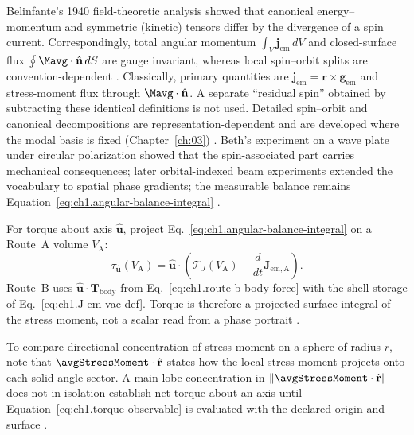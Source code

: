 Belinfante's 1940 field-theoretic analysis \cite{belinfante1940} showed that canonical
energy--momentum and symmetric (kinetic) tensors differ by the divergence of a spin
current. Correspondingly, total angular momentum
$\int_V \mathbf{j}_{\mathrm{em}}\,dV$ and closed-surface flux
$\oint \Mavg\cdot\hat{\mathbf{n}}\,dS$ are gauge invariant, whereas local spin--orbit splits are convention-dependent \cite{belinfante1940}. Classically, primary quantities are $\mathbf{j}_{\mathrm{em}}=\mathbf{r}\times\mathbf{g}_{\mathrm{em}}$ and stress-moment flux through $\Mavg\cdot\hat{\mathbf{n}}$. A separate
``residual spin'' obtained by subtracting these identical definitions is not used.
Detailed spin--orbit and canonical decompositions are representation-dependent and are
developed where the modal basis is fixed (Chapter~\ref{ch:03}) \cite{belinfante1940,tai1994}.
Beth's experiment on a wave plate under circular polarization
\cite{beth1936} showed that the spin-associated part carries mechanical consequences; later orbital-indexed beam experiments
\cite{allen1992} extended the vocabulary to spatial phase gradients; the measurable
balance remains Equation~\eqref{eq:ch1.angular-balance-integral} \cite{belinfante1940}.

For torque about axis $\hat{\mathbf{u}}$, project Eq.~\eqref{eq:ch1.angular-balance-integral} on a Route~A volume $V_{\mathrm{A}}$:
\begin{equation}
\label{eq:ch1.torque-observable}
\tau_{\hat{\mathbf{u}}}(V_{\mathrm{A}})
=\hat{\mathbf{u}}\cdot
\left(
\boldsymbol{\mathcal{T}}_J(V_{\mathrm{A}})-\frac{d}{dt}\mathbf{J}_{\mathrm{em,A}}
\right).
\end{equation}
Route~B uses $\hat{\mathbf{u}}\cdot\mathbf{T}_{\mathrm{body}}$ from Eq.~\eqref{eq:ch1.route-b-body-force} with the shell storage of Eq.~\eqref{eq:ch1.J-em-vac-def}.
Torque is therefore a projected surface integral of the stress moment, not a scalar read from a phase portrait \cite{beth1936,stratton1941}.

To compare directional concentration of stress moment on a sphere of radius $r$, note that $\avgStressMoment\cdot\hat{\mathbf{r}}$ states how the local stress moment projects onto each solid-angle sector. A main-lobe concentration in $\|\avgStressMoment\cdot\hat{\mathbf{r}}\|$ does not in isolation establish net torque about an axis until Equation~\eqref{eq:ch1.torque-observable} is evaluated with the declared origin and surface \cite{stratton1941,beth1936}.
\label{eq:ch1.angular-flux-directional-index}

